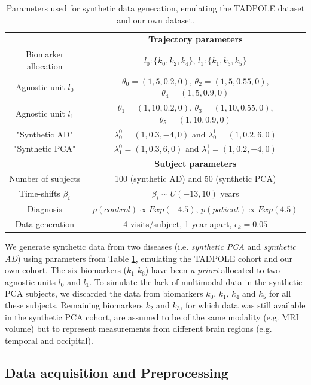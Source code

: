 \documentclass{llncs}
\begin{document}
 \begin{table}
 \begin{tabular}{c | c}
& \textbf{Trajectory parameters} \\
 Biomarker allocation &  $l_0:\{k_0, k_2, k_4\}$, $l_1: \{k_1, k_3, k_5\}$ \\
Agnostic unit $l_0$ &  $\theta_0 = (1,5,0.2,0)$, $\theta_2 = (1,5,0.55,0)$,  $\theta_4 = (1,5,0.9,0)$  \\
Agnostic unit $l_1$ & $\theta_1 = (1,10,0.2,0)$, $\theta_3 = (1,10,0.55,0)$, $\theta_5 = (1,10,0.9,0)$ \\
  
"Synthetic AD" & $\lambda_0^0 = (1, 0.3, -4, 0)$  and $\lambda_0^1 = (1, 0.2, 6, 0)$ \\
 "Synthetic PCA" & $\lambda_1^0 = (1, 0.3, 6, 0)$ and $\lambda_1^1 = (1, 0.2, -4, 0)$ \\
\hline
& \textbf{Subject parameters} \\
 Number of subjects & 100 (synthetic AD) and 50 (synthetic PCA) \\ 
 Time-shifts $\beta_i$ & $\beta_i \sim U(-13,10)$ years \\
 Diagnosis & $p(control) \propto Exp (-4.5)$,  $p(patient) \propto Exp (4.5)$\\
 Data generation & 4 visits/subject, 1 year apart, $\epsilon_k = 0.05$\\ 
\end{tabular}
\caption{Parameters used for synthetic data generation, emulating the TADPOLE dataset and our own dataset.}
\label{tab:synParams}
\end{table}

We generate synthetic data from two diseases (i.e. \emph{synthetic PCA} and \emph{synthetic AD}) using parameters from Table \ref{tab:synParams}, emulating the TADPOLE cohort and our own cohort. The six biomarkers ($k_1$-$k_6$) have been \emph{a-priori} allocated to two agnostic units $l_0$ and $l_1$. To simulate the lack of multimodal data in the synthetic PCA subjects, we discarded the data from biomarkers $k_0$, $k_1$, $k_4$ and $k_5$ for all these subjects. Remaining biomarkers $k_2$ and $k_3$, for which data was still available in the synthetic PCA cohort, are assumed to be of the same modality (e.g. MRI volume) but to represent measurements from different brain regions (e.g. temporal and occipital). 


\subsection{Data acquisition and Preprocessing}
\end{document}

